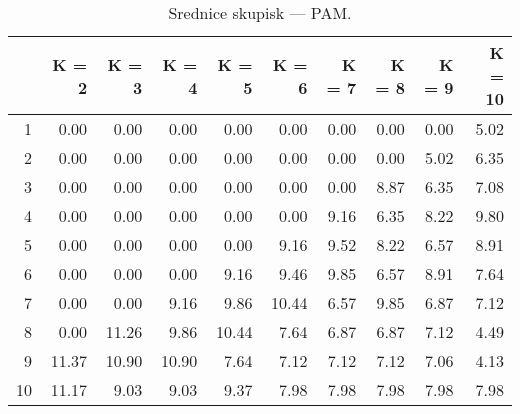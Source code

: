 \begin{table}[ht]
\centering
\begin{tabular}{rrrrrrrrrr}
  \hline
 & K = 2 & K = 3 & K = 4 & K = 5 & K = 6 & K = 7 & K = 8 & K = 9 & K = 10 \\ 
  \hline
1 & 0.00 & 0.00 & 0.00 & 0.00 & 0.00 & 0.00 & 0.00 & 0.00 & 5.02 \\ 
  2 & 0.00 & 0.00 & 0.00 & 0.00 & 0.00 & 0.00 & 0.00 & 5.02 & 6.35 \\ 
  3 & 0.00 & 0.00 & 0.00 & 0.00 & 0.00 & 0.00 & 8.87 & 6.35 & 7.08 \\ 
  4 & 0.00 & 0.00 & 0.00 & 0.00 & 0.00 & 9.16 & 6.35 & 8.22 & 9.80 \\ 
  5 & 0.00 & 0.00 & 0.00 & 0.00 & 9.16 & 9.52 & 8.22 & 6.57 & 8.91 \\ 
  6 & 0.00 & 0.00 & 0.00 & 9.16 & 9.46 & 9.85 & 6.57 & 8.91 & 7.64 \\ 
  7 & 0.00 & 0.00 & 9.16 & 9.86 & 10.44 & 6.57 & 9.85 & 6.87 & 7.12 \\ 
  8 & 0.00 & 11.26 & 9.86 & 10.44 & 7.64 & 6.87 & 6.87 & 7.12 & 4.49 \\ 
  9 & 11.37 & 10.90 & 10.90 & 7.64 & 7.12 & 7.12 & 7.12 & 7.06 & 4.13 \\ 
  10 & 11.17 & 9.03 & 9.03 & 9.37 & 7.98 & 7.98 & 7.98 & 7.98 & 7.98 \\ 
   \hline
\end{tabular}
\caption{Srednice skupisk --- PAM.} 
\label{PAM2}
\end{table}
